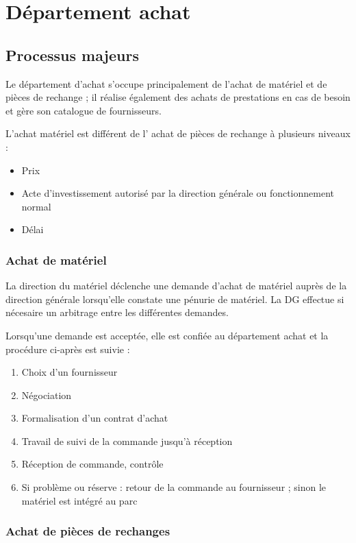 \section{Département achat}

\subsection{Processus majeurs}

Le département d'achat s'occupe principalement de l'achat de matériel et de
pièces de rechange ; il réalise également des achats de prestations en cas
de besoin et gère son catalogue de fournisseurs.

L'achat matériel est différent de l' achat de pièces de rechange à plusieurs niveaux :
\begin{itemize}
\item Prix
\item Acte d'investissement autorisé par la direction générale ou fonctionnement normal
\item Délai
\end{itemize}


\subsubsection{Achat de matériel}

La direction du matériel déclenche une demande d'achat de matériel auprès
de la direction générale lorsqu'elle constate une pénurie de matériel. La
DG effectue si nécesaire un arbitrage entre les différentes demandes.

Lorsqu'une demande est acceptée, elle est confiée au département achat et
la procédure ci-après est suivie :

\begin{enumerate}
\item Choix d'un fournisseur
\item Négociation
\item Formalisation d'un contrat d'achat
\item Travail de suivi de la commande jusqu'à réception
\item Réception de commande, contrôle
\item Si problème ou réserve : retour de la commande au fournisseur ; sinon
        le matériel est intégré au parc
\end{enumerate}


\subsubsection{Achat de pièces de rechanges}

